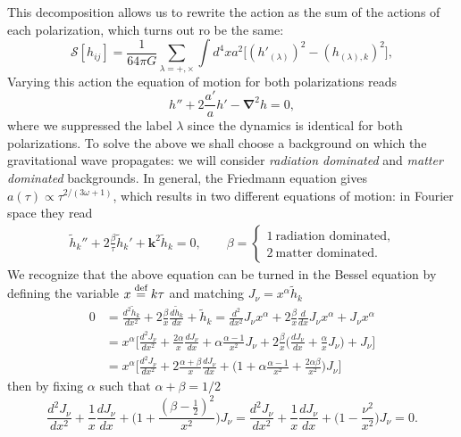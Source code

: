 This decomposition allows us to rewrite the action as the sum of the actions of each polarization, which turns out ro be the same:
\begin{equation*}
    \mathcal{S} [h_{ij}]=\frac{1}{64\pi G}\sum_{\lambda=+,\times}\int d^4xa^2\Big[(h'_{(\lambda)})^2-(h_{(\lambda),k})^2\Big],
\end{equation*}
Varying this action the equation of motion for both polarizations reads
\begin{equation}
    h''+2\frac{a'}{a}h'-\boldsymbol{\nabla}^2h=0,\label{eq:EOM_GW_FREE}
\end{equation} 
where we suppressed the label $\lambda$ since the dynamics is identical for both polarizations. To solve the above we shall choose a background on which the gravitational wave propagates: we will consider \emph{radiation dominated} and \emph{matter dominated}  backgrounds. In general, the Friedmann equation gives $a(\tau)\propto\tau^{2/(3\omega+1)}$, which results in two different equations of motion: in Fourier space they read
\begin{align}
    \tilde h_k''+2\frac{\beta}{\tau}\tilde h_k'+\boldsymbol{k}^2\tilde h_k=0,\qquad \beta=\begin{cases}
        1\ \text{radiation dominated,}\\
        2\ \text{matter dominated.}
    \end{cases}\label{eq:GW_Fourier}
\end{align}
We recognize that the above equation can be turned in the Bessel equation by defining the variable $x\stackrel{\text{def}}{=} k\tau$ and matching $J_\nu=x^\alpha\tilde h_k$
\begin{align*}
    0&=\frac{d^2\tilde h_k}{dx^2}+2\frac{\beta}{x}\frac{d\tilde h_k}{dx}+\tilde h_k=\frac{d^2}{dx^2}J_\nu x^\alpha+2\frac{\beta}{x}\frac{d}{dx}J_\nu x^\alpha+J_\nu x^\alpha\\ &=x^\alpha\bigg[\frac{d^2J_\nu}{dx^2}+\frac{2\alpha}{x}\frac{dJ_\nu}{dx}+\alpha\frac{\alpha-1}{x^2}J_\nu+2\frac{\beta}{x}\bigg(\frac{dJ_\nu}{dx}+\frac{\alpha}{x}J_\nu\bigg)+J_\nu\bigg]\\
    &=x^\alpha\bigg[\frac{d^2J_\nu}{dx^2}+2\frac{\alpha+\beta}{x}\frac{dJ_\nu}{dx}+\bigg(1+\alpha\frac{\alpha-1}{x^2}+\frac{2\alpha\beta}{x^2}\bigg)J_\nu\bigg]
\end{align*}
then by fixing $\alpha$ such that $\alpha+\beta=1/2$ 
$$\frac{d^2J_\nu}{dx^2}+\frac{1}{x}\frac{dJ_\nu}{dx}+\bigg(1+\frac{(\beta-\frac{1}{2})^2}{x^2}\bigg)J_\nu=\frac{d^2J_\nu}{dx^2}+\frac{1}{x}\frac{dJ_\nu}{dx}+\bigg(1-\frac{\nu^2}{x^2}\bigg)J_\nu=0.$$
